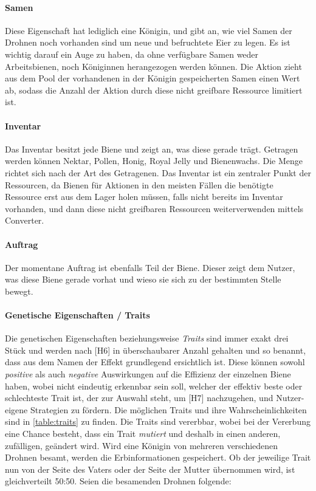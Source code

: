 \paragraph{Samen} 
Diese Eigenschaft hat lediglich eine Königin, und gibt an, wie viel Samen der Drohnen noch vorhanden sind um neue und befruchtete Eier zu legen. Es ist wichtig darauf ein Auge zu haben, da ohne verfügbare Samen weder Arbeitsbienen, noch Königinnen herangezogen werden können. Die Aktion zieht aus dem Pool der vorhandenen in der Königin gespeicherten Samen einen Wert ab, sodass die Anzahl der Aktion durch diese nicht greifbare Ressource limitiert ist.

\paragraph{Inventar} 
Das Inventar besitzt jede Biene und zeigt an, was diese gerade trägt. Getragen werden können Nektar, Pollen, Honig, Royal Jelly und Bienenwachs. Die Menge richtet sich nach der Art des Getragenen. Das Inventar ist ein zentraler Punkt der Ressourcen, da Bienen für Aktionen in den meisten Fällen die benötigte Ressource erst aus dem Lager holen müssen, falls nicht bereits im Inventar vorhanden, und dann diese nicht greifbaren Ressourcen weiterverwenden mittels Converter.

\paragraph{Auftrag} 
Der momentane Auftrag ist ebenfalls Teil der Biene. Dieser zeigt dem Nutzer, was diese Biene gerade vorhat und wieso sie sich zu der bestimmten Stelle bewegt.

\paragraph{Genetische Eigenschaften / Traits} 
Die genetischen Eigenschaften beziehungsweise \textit{Traits} sind immer exakt drei Stück und werden nach [H6] in überschaubarer Anzahl gehalten und so benannt, dass aus dem Namen der Effekt grundlegend ersichtlich ist. Diese können sowohl \textit{positive} als auch \textit{negative} Auswirkungen auf die Effizienz der einzelnen Biene haben, wobei nicht eindeutig erkennbar sein soll, welcher der effektiv beste oder schlechteste Trait ist, der zur Auswahl steht, um [H7] nachzugehen, und Nutzer-eigene Strategien zu fördern. Die möglichen Traits und ihre Wahrscheinlichkeiten sind in \autoref{table:traits} zu finden. Die Traits sind vererbbar, wobei bei der Vererbung eine Chance besteht, dass ein Trait \textit{mutiert} und deshalb in einen anderen, zufälligen, geändert wird. Wird eine Königin von mehreren verschiedenen Drohnen besamt, werden die Erbinformationen gespeichert. Ob der jeweilige Trait nun von der Seite des Vaters oder der Seite der Mutter übernommen wird, ist gleichverteilt 50:50. Seien die besamenden Drohnen folgende:

